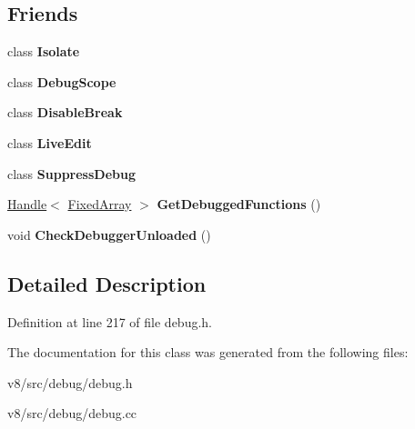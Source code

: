 \subsection*{Friends}
\begin{DoxyCompactItemize}
\item 
\mbox{\label{classv8_1_1internal_1_1Debug_aba4f0964bdacf2bbf62cf876e5d28d0a}} 
class {\bfseries Isolate}
\item 
\mbox{\label{classv8_1_1internal_1_1Debug_a6cfbb0b64c1cf8e4443dc7e5900d8391}} 
class {\bfseries Debug\+Scope}
\item 
\mbox{\label{classv8_1_1internal_1_1Debug_ab05c0a5dd1563dece5579c13b74f5011}} 
class {\bfseries Disable\+Break}
\item 
\mbox{\label{classv8_1_1internal_1_1Debug_a8ec7b8802068537635d90721ff6dc475}} 
class {\bfseries Live\+Edit}
\item 
\mbox{\label{classv8_1_1internal_1_1Debug_a63087cbd2f6e778d5ceeb41df0a0bdc7}} 
class {\bfseries Suppress\+Debug}
\item 
\mbox{\label{classv8_1_1internal_1_1Debug_a478527a61be7002487ff08de6f4294c9}} 
\mbox{\hyperlink{classv8_1_1internal_1_1Handle}{Handle}}$<$ \mbox{\hyperlink{classv8_1_1internal_1_1FixedArray}{Fixed\+Array}} $>$ {\bfseries Get\+Debugged\+Functions} ()
\item 
\mbox{\label{classv8_1_1internal_1_1Debug_a63339cf41b890b43753ace27aca7d79b}} 
void {\bfseries Check\+Debugger\+Unloaded} ()
\end{DoxyCompactItemize}


\subsection{Detailed Description}


Definition at line 217 of file debug.\+h.



The documentation for this class was generated from the following files\+:\begin{DoxyCompactItemize}
\item 
v8/src/debug/debug.\+h\item 
v8/src/debug/debug.\+cc\end{DoxyCompactItemize}
